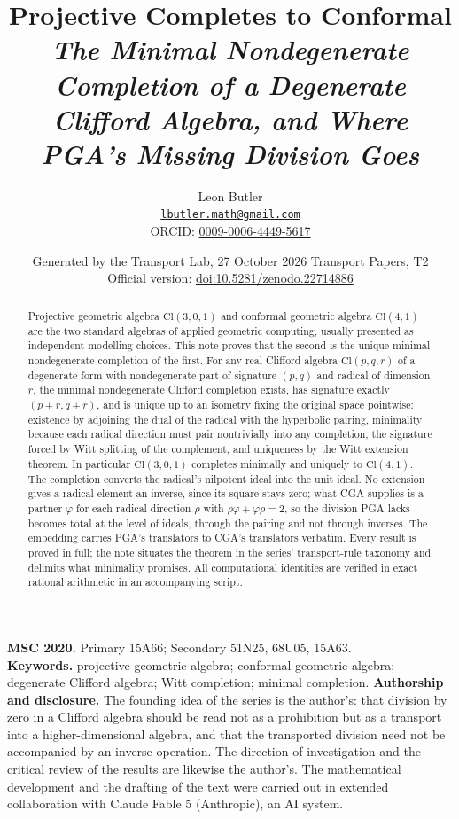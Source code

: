 \documentclass[11pt]{article}
\title{\bfseries Projective Completes to Conformal\\[4pt]\large\itshape The Minimal Nondegenerate Completion of a Degenerate Clifford Algebra, and Where PGA's Missing Division Goes}
\author{Leon Butler\\ \normalsize\href{mailto:lbutler.math@gmail.com}{\texttt{lbutler.math@gmail.com}}\\ \normalsize ORCID: \href{https://orcid.org/0009-0006-4449-5617}{0009-0006-4449-5617}}
\date{Generated by the Transport Lab, 27 October 2026 \textperiodcentered{} Transport Papers, T2\\[3pt]\small Official version: \href{https://doi.org/10.5281/zenodo.22714886}{doi:10.5281/zenodo.22714886}}
\theoremstyle{definition}
\theoremstyle{plain}
\providecommand{\Cl}{}\renewcommand{\Cl}{\mathrm{Cl}}
\begin{document}
\maketitle
\begin{abstract}
\normalsize
Projective geometric algebra $\Cl(3,0,1)$ and conformal geometric algebra $\Cl(4,1)$ are the two standard algebras of applied geometric computing, usually presented as independent modelling choices. This note proves that the second is the unique minimal nondegenerate completion of the first. For any real Clifford algebra $\Cl(p,q,r)$ of a degenerate form with nondegenerate part of signature $(p,q)$ and radical of dimension $r$, the minimal nondegenerate Clifford completion exists, has signature exactly $(p{+}r, q{+}r)$, and is unique up to an isometry fixing the original space pointwise: existence by adjoining the dual of the radical with the hyperbolic pairing, minimality because each radical direction must pair nontrivially into any completion, the signature forced by Witt splitting of the complement, and uniqueness by the Witt extension theorem. In particular $\Cl(3,0,1)$ completes minimally and uniquely to $\Cl(4,1)$. The completion converts the radical's nilpotent ideal into the unit ideal. No extension gives a radical element an inverse, since its square stays zero; what CGA supplies is a partner $\varphi$ for each radical direction $\rho$ with $\rho\varphi + \varphi\rho = 2$, so the division PGA lacks becomes total at the level of ideals, through the pairing and not through inverses. The embedding carries PGA's translators to CGA's translators verbatim. Every result is proved in full; the note situates the theorem in the series' transport-rule taxonomy and delimits what minimality promises. All computational identities are verified in exact rational arithmetic in an accompanying script.
\end{abstract}
\medskip
\noindent\textbf{MSC 2020.} Primary 15A66; Secondary 51N25, 68U05, 15A63.\\
\textbf{Keywords.} projective geometric algebra; conformal geometric algebra; degenerate Clifford algebra; Witt completion; minimal completion.
\newpage
\noindent \textbf{Authorship and disclosure. }The founding idea of the series is the author's: that division by zero in a Clifford algebra should be read not as a prohibition but as a transport into a higher-dimensional algebra, and that the transported division need not be accompanied by an inverse operation. The direction of investigation and the critical review of the results are likewise the author's. The mathematical development and the drafting of the text were carried out in extended collaboration with Claude Fable 5 (Anthropic), an AI system.
\end{document}
